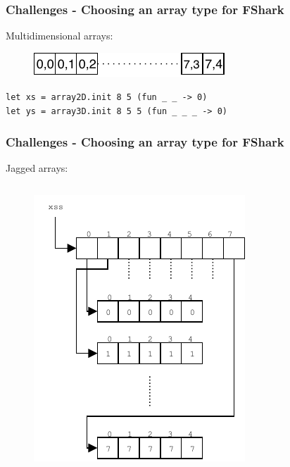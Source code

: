 \documentclass[10pt, compress, usenames, dvipsnames]{beamer}
\begin{document}
\begin{frame}
  \frametitle{Challenges - Choosing an array type for FShark}
{
  Multidimensional arrays:\\
}
{
\begin{figure}
  \centering
  \includegraphics[scale=1]{./images/flatarrays}
\end{figure}
}

{
  \texttt{let xs = array2D.init 8 5 (fun \_ \_ -> 0)}\\
  \texttt{let ys = array3D.init 8 5 5 (fun \_ \_ \_ -> 0)}
}
\end{frame}
\begin{frame}
  \frametitle{Challenges - Choosing an array type for FShark}
  Jagged arrays:\\
  \begin{columns}
    \begin{column}{.48\textwidth}
  \begin{figure}
    \centering
    \includegraphics[scale=1]{./images/jaggedarrays}
  \end{figure}
    \end{column}
    \begin{column}{.48\textwidth}
    \end{column}
  \end{columns}
\end{frame}
\end{document}
